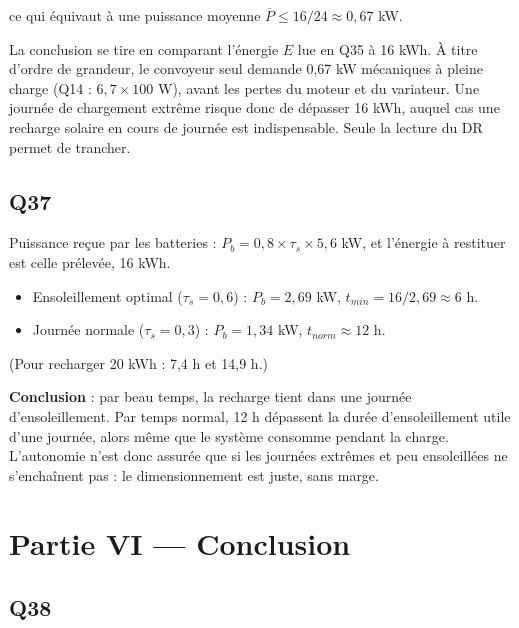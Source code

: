 \documentclass[11pt,a4paper]{article}
\providecommand{\tightlist}{\setlength{\itemsep}{0pt}\setlength{\parskip}{0pt}}
\newcommand{\equationajustee}[1]{%
  \sbox{\boiteequation}{$\displaystyle #1$}%
  \ifdim\wd\boiteequation>\linewidth
    \[\resizebox{\linewidth}{!}{\usebox{\boiteequation}}\]%
  \else
    \[#1\]%
  \fi}
\begin{document}
\equationajustee{\boxed{E\le16\ \mathrm{kWh}}}

ce qui équivaut à une puissance moyenne \(\overline P\le16/24\approx0{,}67\) kW.

La conclusion se tire en comparant l'énergie \(E\) lue en Q35 à 16 kWh. À titre d'ordre de grandeur, le convoyeur seul demande 0,67 kW mécaniques à pleine charge (Q14 : \(6{,}7\times100\) W), avant les pertes du moteur et du variateur. Une journée de chargement extrême risque donc de dépasser 16 kWh, auquel cas une recharge solaire en cours de journée est indispensable. Seule la lecture du DR permet de trancher.

\hypertarget{q37}{%
\subsection{Q37}\label{q37}}

Puissance reçue par les batteries : \(P_b=0{,}8\times\tau_s\times5{,}6\) kW, et l'énergie à restituer est celle prélevée, 16 kWh.

\begin{itemize}
\tightlist
\item
  Ensoleillement optimal (\(\tau_s=0{,}6\)) : \(P_b=2{,}69\) kW, \(t_{min}=16/2{,}69\approx6\) h.
\item
  Journée normale (\(\tau_s=0{,}3\)) : \(P_b=1{,}34\) kW, \(t_{norm}\approx12\) h.
\end{itemize}

\equationajustee{\boxed{t_{min}\approx6\ \mathrm h}}

\equationajustee{\boxed{t_{norm}\approx12\ \mathrm h}}

(Pour recharger 20 kWh : 7,4 h et 14,9 h.)

\textbf{Conclusion} : par beau temps, la recharge tient dans une journée d'ensoleillement. Par temps normal, 12 h dépassent la durée d'ensoleillement utile d'une journée, alors même que le système consomme pendant la charge. L'autonomie n'est donc assurée que si les journées extrêmes et peu ensoleillées ne s'enchaînent pas : le dimensionnement est juste, sans marge.

\hypertarget{partie-vi-conclusion}{%
\section{Partie VI --- Conclusion}\label{partie-vi-conclusion}}

\hypertarget{q38}{%
\subsection{Q38}\label{q38}}
\end{document}
